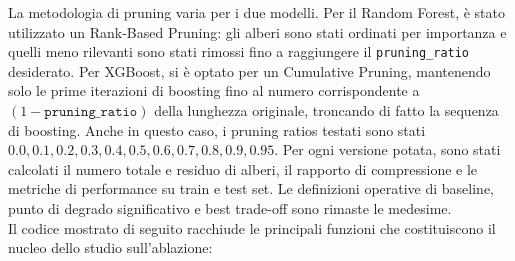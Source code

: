 \documentclass[a4paper,12pt]{report}
\begin{document}
	La metodologia di pruning varia per i due modelli. Per il Random Forest, è stato utilizzato un Rank-Based Pruning: gli alberi sono stati ordinati per importanza e quelli meno rilevanti sono stati rimossi fino a raggiungere il \texttt{pruning\_ratio} desiderato. Per XGBoost, si è optato per un Cumulative Pruning, mantenendo solo le prime iterazioni di boosting fino al numero corrispondente a \((1 - \texttt{pruning\_ratio})\) della lunghezza originale, troncando di fatto la sequenza di boosting. Anche in questo caso, i pruning ratios testati sono stati ${0.0,0.1,0.2,0.3,0.4,0.5,0.6,0.7,0.8,0.9,0.95}$. Per ogni versione potata, sono stati calcolati il numero totale e residuo di alberi, il rapporto di compressione e le metriche di performance su train e test set. Le definizioni operative di baseline, punto di degrado significativo e best trade-off sono rimaste le medesime. \\
	Il codice mostrato di seguito racchiude le principali funzioni che costituiscono il nucleo dello studio sull’ablazione:
\end{document}

